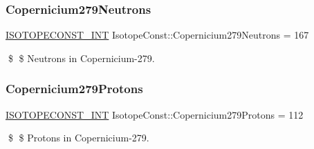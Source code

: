 \subsubsection{\texorpdfstring{Copernicium279\+Neutrons}{Copernicium279Neutrons}}
{\footnotesize\ttfamily \mbox{\hyperlink{group___isotope_const-_macros_ga5f18360b3e99483a35c32d789e62621c}{I\+S\+O\+T\+O\+P\+E\+C\+O\+N\+S\+T\+\_\+\+I\+NT}} Isotope\+Const\+::\+Copernicium279\+Neutrons = 167}

\$ \$ Neutrons in Copernicium-\/279. \mbox{\label{group___isotope_const-_copernicium-_cn279_ga166692c29c177a0807ca211710b8d131}} 
\subsubsection{\texorpdfstring{Copernicium279\+Protons}{Copernicium279Protons}}
{\footnotesize\ttfamily \mbox{\hyperlink{group___isotope_const-_macros_ga5f18360b3e99483a35c32d789e62621c}{I\+S\+O\+T\+O\+P\+E\+C\+O\+N\+S\+T\+\_\+\+I\+NT}} Isotope\+Const\+::\+Copernicium279\+Protons = 112}

\$ \$ Protons in Copernicium-\/279. 
